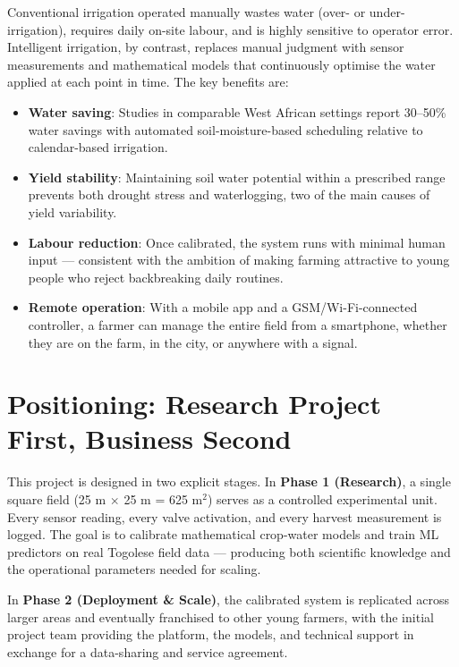 \documentclass[12pt, a4paper]{report}
\begin{document}
Conventional irrigation operated manually wastes water (over- or under-irrigation), requires daily on-site labour, and is highly sensitive to operator error. Intelligent irrigation, by contrast, replaces manual judgment with sensor measurements and mathematical models that continuously optimise the water applied at each point in time. The key benefits are:

\begin{itemize}[leftmargin=2em]
  \item \textbf{Water saving}: Studies in comparable West African settings report 30–50\% water savings with automated soil-moisture-based scheduling relative to calendar-based irrigation.
  \item \textbf{Yield stability}: Maintaining soil water potential within a prescribed range prevents both drought stress and waterlogging, two of the main causes of yield variability.
  \item \textbf{Labour reduction}: Once calibrated, the system runs with minimal human input — consistent with the ambition of making farming attractive to young people who reject backbreaking daily routines.
  \item \textbf{Remote operation}: With a mobile app and a GSM/Wi-Fi-connected controller, a farmer can manage the entire field from a smartphone, whether they are on the farm, in the city, or anywhere with a signal.
\end{itemize}

\section{Positioning: Research Project First, Business Second}

This project is designed in two explicit stages. In \textbf{Phase 1 (Research)}, a single square field (25 m $\times$ 25 m = 625 m$^{2}$) serves as a controlled experimental unit. Every sensor reading, every valve activation, and every harvest measurement is logged. The goal is to calibrate mathematical crop-water models and train ML predictors on real Togolese field data — producing both scientific knowledge and the operational parameters needed for scaling.

In \textbf{Phase 2 (Deployment \& Scale)}, the calibrated system is replicated across larger areas and eventually franchised to other young farmers, with the initial project team providing the platform, the models, and technical support in exchange for a data-sharing and service agreement.
\end{document}
